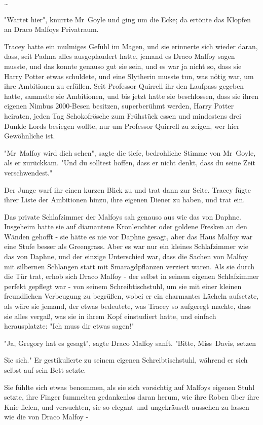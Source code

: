 {…

"Wartet hier", knurrte Mr~Goyle und ging um die Ecke; da ertönte das Klopfen an Draco Malfoys Privatraum.

Tracey hatte ein mulmiges Gefühl im Magen, und sie erinnerte sich wieder daran, dass, seit Padma alles ausgeplaudert hatte, jemand es Draco Malfoy sagen musste, und das konnte genauso gut sie sein, und es war ja nicht so, dass sie Harry Potter etwas schuldete, und eine Slytherin musste tun, was nötig war, um ihre Ambitionen zu erfüllen. Seit Professor Quirrell ihr den Laufpass gegeben hatte, sammelte sie Ambitionen, und bis jetzt hatte sie beschlossen, dass sie ihren eigenen Nimbus 2000-Besen besitzen, superberühmt werden, Harry Potter heiraten, jeden Tag Schokofrösche zum Frühstück essen und mindestens drei Dunkle Lords besiegen wollte, nur um Professor Quirrell zu zeigen, wer hier Gewöhnliche ist.

"Mr~Malfoy wird dich sehen", sagte die tiefe, bedrohliche Stimme von Mr~Goyle, als er zurückkam. "Und du solltest hoffen, dass er nicht denkt, dass du seine Zeit verschwendest."

Der Junge warf ihr einen kurzen Blick zu und trat dann zur Seite. Tracey fügte ihrer Liste der Ambitionen hinzu, ihre eigenen Diener zu haben, und trat ein.

Das private Schlafzimmer der Malfoys sah genauso aus wie das von Daphne. Insgeheim hatte sie auf diamantene Kronleuchter oder goldene Fresken an den Wänden gehofft - sie hätte es nie vor Daphne gesagt, aber das Haus Malfoy war eine Stufe besser als Greengrass. Aber es war nur ein kleines Schlafzimmer wie das von Daphne, und der einzige Unterschied war, dass die Sachen von Malfoy mit silbernen Schlangen statt mit Smaragdpflanzen verziert waren. Als sie durch die Tür trat, erhob sich Draco Malfoy - der selbst in seinem eigenen Schlafzimmer perfekt gepflegt war - von seinem Schreibtischstuhl, um sie mit einer kleinen freundlichen Verbeugung zu begrüßen, wobei er ein charmantes Lächeln aufsetzte, als wäre sie jemand, der etwas bedeutete, was Tracey so aufgeregt machte, dass sie alles vergaß, was sie in ihrem Kopf einstudiert hatte, und einfach herausplatzte: "Ich muss dir etwas sagen!"

"Ja, Gregory hat es gesagt", sagte Draco Malfoy sanft. "Bitte, Miss~Davis, setzen

Sie sich." Er gestikulierte zu seinem eigenen Schreibtischstuhl, während er sich selbst auf sein Bett setzte.

Sie fühlte sich etwas benommen, als sie sich vorsichtig auf Malfoys eigenen Stuhl setzte, ihre Finger fummelten gedankenlos daran herum, wie ihre Roben über ihre Knie fielen, und versuchten, sie so elegant und ungekräuselt aussehen zu lassen wie die von Draco Malfoy -

}
